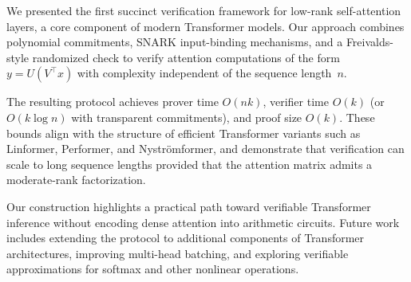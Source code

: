 \documentclass[11pt]{article}
\begin{document}
We presented the first succinct verification framework for low-rank
self-attention layers, a core component of modern Transformer models.
Our approach combines polynomial commitments, SNARK input-binding
mechanisms, and a Freivalds-style randomized check to verify
attention computations of the form $y = U(V^\top x)$ with complexity
independent of the sequence length~$n$.

The resulting protocol achieves prover time $O(nk)$, verifier time
$O(k)$ (or $O(k\log n)$ with transparent commitments), and proof size
$O(k)$.
These bounds align with the structure of efficient Transformer variants
such as Linformer, Performer, and Nyströmformer, and demonstrate that
verification can scale to long sequence lengths provided that the
attention matrix admits a moderate-rank factorization.

Our construction highlights a practical path toward verifiable
Transformer inference without encoding dense attention into arithmetic
circuits.
Future work includes extending the protocol to additional components of
Transformer architectures, improving multi-head batching, and exploring
verifiable approximations for softmax and other nonlinear operations.




\end{document}
